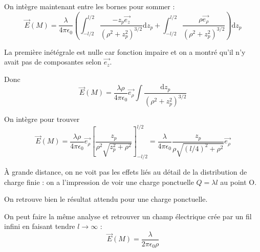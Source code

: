 \documentclass[french]{yLectureNote}
\renewcommand{\vec}{\overrightarrow}
\newcommand{\dd}{\mathrm{d}}
\newcommand{\E}{\vec{E}(M)}
\newcommand{\er}{\vec{e_{\rho}}}
\begin{document}
On intègre maintenant entre les bornes pour sommer :
\[\E = \frac{\lambda}{4\pi\epsilon_0}(\int_{-l/2}^{l/2}\frac{-z_p\vec{e_z}}{(\rho^2+z_p^2)^{3/2}}\dd z_p + \int_{-l/2}^{l/2}\frac{\rho\er}{(\rho^2+z_p^2)^{3/2}})\dd z_p\]

La première inétégrale est nulle car fonction impaire et on a montré qu'il n'y avait pas de composantes selon \(\vec{e_z}\).

Donc \[\E = \frac{\lambda\rho}{4\pi\epsilon_0}\er\int\frac{\dd z_p}{(\rho^2+z_p^2)^{3/2}}\]

On intègre pour trouver \[\E = \frac{\lambda\rho}{4\pi\epsilon_0}\er [\frac{z_p}{\rho^2\sqrt{z_p^2+\rho^2}}]^{l/2}_{-l/2} =  \frac{\lambda}{4\pi\epsilon_0} \frac{z_p}{\rho\sqrt{(l/4)^2+\rho^2}} \er \]

À grande distance, on ne voit pas les effets liés au détail de la distribution de charge finie : on a l'impression de voir une charge ponctuelle \(Q = \lambda l\) au point O.

On retrouve bien le résultat attendu pour une charge ponctuelle.

On peut faire la m\^eme analyse et retrouver un champ électrique crée par un fil infini en faisant tendre \(l\to \infty\) : \[\E = \frac{\lambda}{2\pi \epsilon_0 \rho}\]

 
\end{document}
